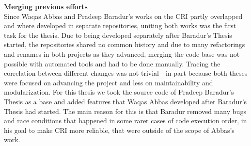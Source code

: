 	\textbf{Merging previous efforts}\\
	
	Since Waqas Abbas and Pradeep Baradur's works on the CRI partly overlapped and where developed in separate repositories, uniting both works was the first task for the thesis. Due to being developed separately after Baradur's Thesis started, the repositories shared no common history and due to many refactorings and renames in both projects as they advanced, merging the code base was not possible with automated tools and had to be done manually. Tracing the correlation between different changes was not trivial - in part because both theses were focused on advancing the project and less on maintainability and modularization. For this thesis we took the source code of Pradeep Baradur's Thesis as a base and added features that Waqas Abbas developed after Baradur's Thesis had started. The main reason for this is that Baradur removed many bugs and race conditions that happened in some rarer cases of code execution order, in his goal to make CRI more reliable, that were outside of the scope of Abbas's work.
		
